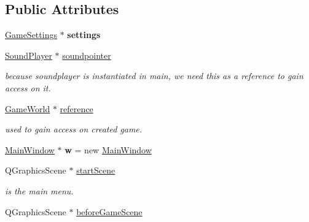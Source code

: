 \subsection*{Public Attributes}
\begin{DoxyCompactItemize}
\item 
\hyperlink{class_game_settings}{Game\+Settings} $\ast$ {\bfseries settings}\hypertarget{class_game_menu_a0047e42e8cef38e9faa5ba67d6dea508}{}\label{class_game_menu_a0047e42e8cef38e9faa5ba67d6dea508}

\item 
\hyperlink{class_sound_player}{Sound\+Player} $\ast$ \hyperlink{class_game_menu_a9dfd20cecbc58d41918f85f08942065d}{soundpointer}\hypertarget{class_game_menu_a9dfd20cecbc58d41918f85f08942065d}{}\label{class_game_menu_a9dfd20cecbc58d41918f85f08942065d}

\begin{DoxyCompactList}\small\item\em because soundplayer is instantiated in main, we need this as a reference to gain access on it. \end{DoxyCompactList}\item 
\hyperlink{class_game_world}{Game\+World} $\ast$ \hyperlink{class_game_menu_acd0a5b94ff397f9247088d5942c27341}{reference}\hypertarget{class_game_menu_acd0a5b94ff397f9247088d5942c27341}{}\label{class_game_menu_acd0a5b94ff397f9247088d5942c27341}

\begin{DoxyCompactList}\small\item\em used to gain access on created game. \end{DoxyCompactList}\item 
\hyperlink{class_main_window}{Main\+Window} $\ast$ {\bfseries w} = new \hyperlink{class_main_window}{Main\+Window}\hypertarget{class_game_menu_ab2cbc2fb13a1e67c958efe22a58c5ec2}{}\label{class_game_menu_ab2cbc2fb13a1e67c958efe22a58c5ec2}

\item 
Q\+Graphics\+Scene $\ast$ \hyperlink{class_game_menu_ab72c5ce17a0f06580b74c495cb9694ce}{start\+Scene}\hypertarget{class_game_menu_ab72c5ce17a0f06580b74c495cb9694ce}{}\label{class_game_menu_ab72c5ce17a0f06580b74c495cb9694ce}

\begin{DoxyCompactList}\small\item\em is the main menu. \end{DoxyCompactList}\item 
Q\+Graphics\+Scene $\ast$ \hyperlink{class_game_menu_a96efe4b74ad120a5920e141cec544f94}{before\+Game\+Scene}\hypertarget{class_game_menu_a96efe4b74ad120a5920e141cec544f94}{}\label{class_game_menu_a96efe4b74ad120a5920e141cec544f94}


\end{DoxyCompactItemize}
